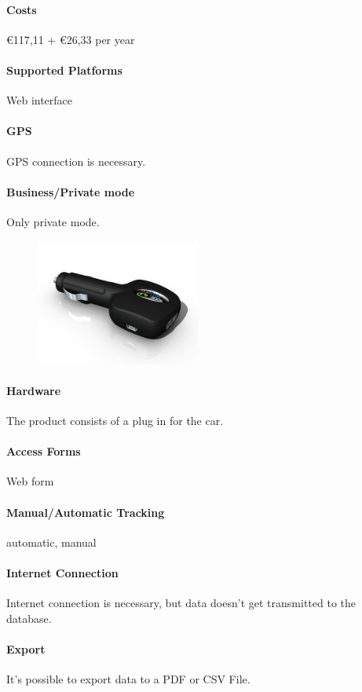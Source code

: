 \paragraph{Costs} \euro 117,11 + \euro 26,33 per year
\paragraph{Supported Platforms} Web interface
\paragraph{GPS} GPS connection is necessary.
\paragraph{Business/Private mode} Only private mode.
\begin{figure}
  \begin{center}
    \includegraphics[width=0.48\textwidth]{GPSlogbook2}
  \end{center}
\end{figure}
\paragraph{Hardware}The product consists of a plug in for the car.
\paragraph{Access Forms} Web form
\paragraph{Manual/Automatic Tracking}automatic, manual
\paragraph{Internet Connection}Internet connection is necessary, but data doesn't get transmitted to the database.
\paragraph{Export}It's possible to export data to a PDF or CSV File.
